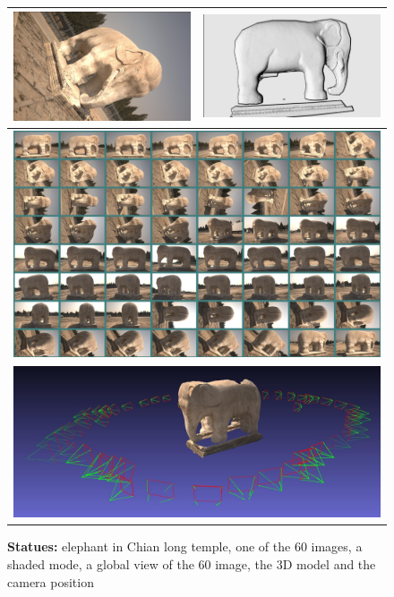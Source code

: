 \begin{figure}
\begin{tabular}{||c|c||}
   \hline \hline 
   \includegraphics[width=80mm]{FIGS/SAMPLES/DoocDOC-Eleph-Photo.jpg} &
   \includegraphics[width=80mm]{FIGS/SAMPLES/Doc-Elph-Shade.jpg}   \\ \hline  \hline
   \multicolumn{2}{||c||}{ \includegraphics[width=150mm]{FIGS/SAMPLES/Doc-Pl-Eleph.jpg}} \\ \hline  \hline
   \multicolumn{2}{||c||}{ \includegraphics[width=150mm]{FIGS/SAMPLES/Doc-Eleph-3D.jpg}} \\ \hline  \hline
\end{tabular}
\caption{{\bf Statues:} elephant in Chian long temple, one of the 60 images, a shaded mode, a global view of the 60 image,
the $3$D model and the camera position}
\label{View:Eleph}
\end{figure}

